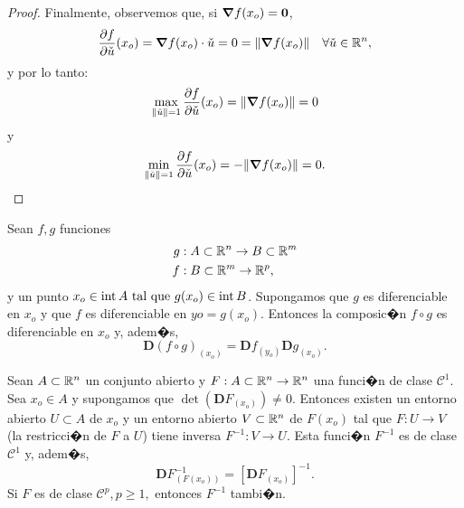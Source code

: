 \documentclass[a4paper]{scrartcl} %
\begin{document}
\begin{theorem}
\begin{proof}
Finalmente, observemos que, si $\grad f(x_o) = \mathbf{0}$, 
\[
 \frac{\partial f}{\partial \check{u}} (x_o) = \grad f (x_o) \cdot \check{u} = 0 = \norm{\grad f(x_o)} \quad \forall \check{u} \in \mathbb{R}^n,
\]
y por lo tanto:
\[
 \max_{\norm{\check{u}}=1} \frac{\partial f}{\partial \check{u}} (x_o) = \norm{\grad f(x_o)} = 0
\]
y
\[
 \min_{\norm{\check{u}}=1} \frac{\partial f}{\partial \check{u}} (x_o) = -\norm{\grad f(x_o)} = 0.
\]

\end{proof}

\end{theorem}

\begin{theorem} \label{teo:cadena}
\mbox{}

  Sean $f, g$ funciones 
    \begin{align*}
    g &:A \subset \mathbb{R}^n \to B \subset \mathbb{R}^m \\
    f &:B \subset \mathbb{R}^m \to \mathbb{R}^p,
    \end{align*}
  y un punto $x_o \in \operatorname{int}{A} \text{ tal que } g(x_o) \in \operatorname{int}{B}$. Supongamos que $g$ es diferenciable en $x_o$ y que $f$ es diferenciable en $yo = g(x_o)$. Entonces la composic�n $f \circ g$ es diferenciable en $x_o$ y, adem�s,
  \[
   \mathbf{D}(f \circ g)_{(x_o)} = \mathbf{D}f_{(y_o)} 
   \mathbf{D}g_{(x_o)}.
  \]
\end{theorem}

\begin{theorem} \label{teo:inversa}
\mbox{}

 Sean $A \subset \mathbb{R}^n$ un conjunto abierto y $F: A \subset \mathbb{R}^n \to \mathbb{R}^n$ una funci�n de clase $\mathcal{C}^1$. Sea $x_o \in A$ y supongamos que $\det(\mathbf{D}F_{(x_o)}) \ne 0$. Entonces existen un entorno abierto $U \subset A$ de $x_o$ y un entorno abierto $V \subset \mathbb{R}^n$ de $F(x_o)$ tal que $F:U \to V$ (la restricci�n de $F$ a $U$) tiene inversa $F^{-1}:V \to U$. Esta funci�n $F^{-1}$ es de clase $\mathcal{C}^1$ y, adem�s,
 \[
  \mathbf{D}F^{-1}_{(F(x_o))} = \left[ \mathbf{D}F_{(x_o)} \right]^{-1}.
 \]
 Si $F$ es de clase $\mathcal{C}^p, p \ge 1,$ entonces $F^{-1}$ tambi�n.
\end{theorem}
\end{document}
